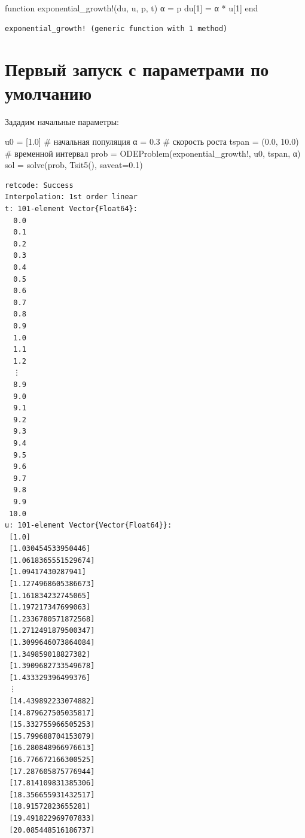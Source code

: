 \documentclass[
  12pt,
  a4paper,
  DIV=11,
  numbers=noendperiod]{scrreprt}
\newenvironment{Shaded}{\begin{snugshade}}{\end{snugshade}}
\newcommand{\CommentTok}[1]{\textcolor[rgb]{0.37,0.37,0.37}{#1}}
\newcommand{\FloatTok}[1]{\textcolor[rgb]{0.68,0.00,0.00}{#1}}
\newcommand{\FunctionTok}[1]{\textcolor[rgb]{0.28,0.35,0.67}{#1}}
\newcommand{\KeywordTok}[1]{\textcolor[rgb]{0.00,0.23,0.31}{#1}}
\newcommand{\NormalTok}[1]{\textcolor[rgb]{0.00,0.23,0.31}{#1}}
\newcommand{\OperatorTok}[1]{\textcolor[rgb]{0.37,0.37,0.37}{#1}}
\begin{document}
\begin{Shaded}
\begin{Highlighting}[]
\KeywordTok{function} \FunctionTok{exponential\_growth!}\NormalTok{(du, u, p, t)}
\NormalTok{α }\OperatorTok{=}\NormalTok{ p}
\NormalTok{du[}\FloatTok{1}\NormalTok{] }\OperatorTok{=}\NormalTok{ α }\OperatorTok{*}\NormalTok{ u[}\FloatTok{1}\NormalTok{]}
\KeywordTok{end}
\end{Highlighting}
\end{Shaded}

\begin{verbatim}
exponential_growth! (generic function with 1 method)
\end{verbatim}

\section{Первый запуск с параметрами по
умолчанию}\label{ux43fux435ux440ux432ux44bux439-ux437ux430ux43fux443ux441ux43a-ux441-ux43fux430ux440ux430ux43cux435ux442ux440ux430ux43cux438-ux43fux43e-ux443ux43cux43eux43bux447ux430ux43dux438ux44e}

Зададим начальные параметры:

\begin{Shaded}
\begin{Highlighting}[]
\NormalTok{u0 }\OperatorTok{=}\NormalTok{ [}\FloatTok{1.0}\NormalTok{] }\CommentTok{\# начальная популяция}
\NormalTok{α }\OperatorTok{=} \FloatTok{0.3} \CommentTok{\# скорость роста}
\NormalTok{tspan }\OperatorTok{=}\NormalTok{ (}\FloatTok{0.0}\NormalTok{, }\FloatTok{10.0}\NormalTok{) }\CommentTok{\# временной интервал}
\NormalTok{prob }\OperatorTok{=} \FunctionTok{ODEProblem}\NormalTok{(exponential\_growth!, u0, tspan, α)}
\NormalTok{sol }\OperatorTok{=} \FunctionTok{solve}\NormalTok{(prob, }\FunctionTok{Tsit5}\NormalTok{(), saveat}\OperatorTok{=}\FloatTok{0.1}\NormalTok{)}
\end{Highlighting}
\end{Shaded}

\begin{verbatim}
retcode: Success
Interpolation: 1st order linear
t: 101-element Vector{Float64}:
  0.0
  0.1
  0.2
  0.3
  0.4
  0.5
  0.6
  0.7
  0.8
  0.9
  1.0
  1.1
  1.2
  ⋮
  8.9
  9.0
  9.1
  9.2
  9.3
  9.4
  9.5
  9.6
  9.7
  9.8
  9.9
 10.0
u: 101-element Vector{Vector{Float64}}:
 [1.0]
 [1.030454533950446]
 [1.0618365551529674]
 [1.09417430287941]
 [1.1274968605386673]
 [1.161834232745065]
 [1.197217347699063]
 [1.2336780571872568]
 [1.2712491879500347]
 [1.3099646073864084]
 [1.349859018827382]
 [1.3909682733549678]
 [1.433329396499376]
 ⋮
 [14.439892233074882]
 [14.879627505035817]
 [15.332755966505253]
 [15.799688704153079]
 [16.280848966976613]
 [16.776672166300525]
 [17.287605875776944]
 [17.814109831385306]
 [18.356655931432517]
 [18.91572823655281]
 [19.491822969707833]
 [20.085448516186737]
\end{verbatim}
\end{document}
